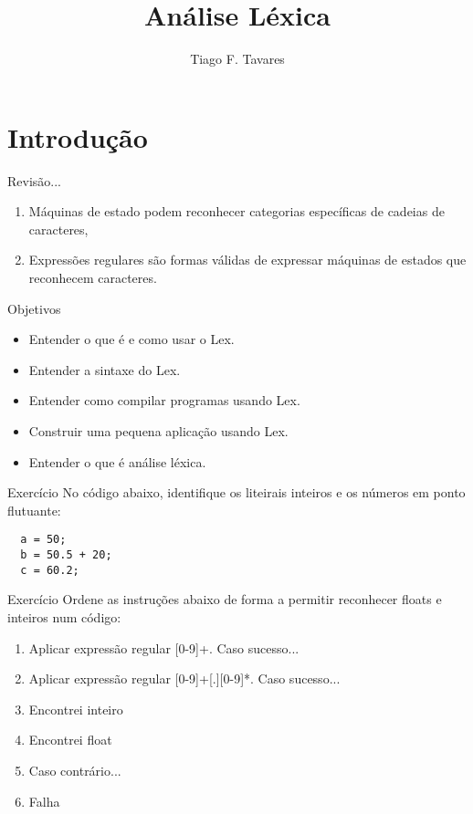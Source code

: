 \documentclass{beamer}
\title[05-Análise Léxica]{Análise Léxica}
\author{Tiago F. Tavares}
\institute{FEEC -- UNICAMP}
\date{}
\begin{document}
\begin{frame}
  \titlepage
\end{frame}


\section{Introdução}

\begin{frame}{Revisão...}
  \Large
  \begin{enumerate}
  \item Máquinas de estado podem reconhecer categorias específicas de cadeias de
    caracteres,
  \item Expressões regulares são formas válidas de expressar máquinas de estados
    que reconhecem caracteres.
  \end{enumerate}
\end{frame}


\begin{frame}{Objetivos}
  \Large
  \begin{itemize}
    \item Entender o que é e como usar o Lex.
    \item Entender a sintaxe do Lex.
    \item Entender como compilar programas usando Lex.
    \item Construir uma pequena aplicação usando Lex.
    \item Entender o que é análise léxica.
  \end{itemize}
\end{frame}

\begin{frame}[fragile]{Exercício}
  \centering
  No código abaixo, identifique os liteirais inteiros e os números em ponto
  flutuante:

  \begin{verbatim}
  a = 50;
  b = 50.5 + 20;
  c = 60.2;
  \end{verbatim}

\end{frame}

\begin{frame}{Exercício}
  Ordene as instruções abaixo de forma a permitir reconhecer floats e inteiros
  num código:
  \begin{enumerate}
    \item Aplicar expressão regular \textsc{[0-9]+}. Caso sucesso...
    \item Aplicar expressão regular \textsc{[0-9]+[.][0-9]*}. Caso sucesso...
    \item Encontrei inteiro
    \item Encontrei float
    \item Caso contrário...
    \item Falha
  \end{enumerate}
\end{frame}
\end{document}
